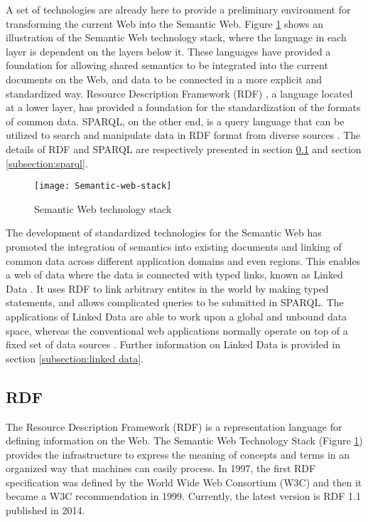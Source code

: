 A set of technologies are already here to provide a preliminary environment for transforming the current Web into the Semantic Web. Figure \ref{figure:semantic web stack} shows an illustration of the Semantic Web technology stack, where the language in each layer is dependent on the layers below it. These languages have provided a foundation for allowing shared semantics to be integrated into the current documents on the Web, and data to be connected in a more explicit and standardized way. Resource Description Framework (RDF) \cite{Cyganiak2014}, a language located at a lower layer, has provided a foundation for the standardization of the formats of common data. SPARQL, on the other end, is a query language that can be utilized to search and manipulate data in RDF format from diverse sources \cite{Harris2013}. The details of RDF and SPARQL are respectively presented in section \ref{subsection:rdf} and section \ref{subsection:sparql}.

\begin{figure}[h]
\texttt{[image: Semantic-web-stack]}
\centering
\caption{Semantic Web technology stack}
\label{figure:semantic web stack}
\end{figure}

The development of standardized technologies for the Semantic Web has promoted the integration of semantics into existing documents and linking of common data across different application domains and even regions. This enables a web of data where the data is connected with typed links, known as Linked Data \cite{Bizer2009}. It uses RDF to link arbitrary entites in the world by making typed statements, and allows complicated queries to be submitted in SPARQL. The applications of Linked Data are able to work upon a global and unbound data space, whereas the conventional web applications normally operate on top of a fixed set of data sources \cite{Bizer2009}. Further information on Linked Data is provided in section \ref{subsection:linked data}.

\subsection{RDF} \label{subsection:rdf}

The Resource Description Framework (RDF) is a representation language for defining information on the Web. The Semantic Web Technology Stack (Figure \ref{figure:semantic web stack}) provides the infrastructure to express the meaning of concepts and terms in an organized way that machines can easily process. In 1997, the first RDF specification was defined by the World Wide Web Consortium (W3C) and then it became a W3C recommendation in 1999. Currently, the latest version is RDF 1.1 \cite{Cyganiak2014} published in 2014.

